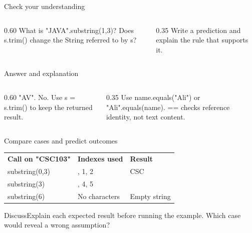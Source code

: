 \documentclass[10pt,aspectratio=169]{beamer}
\begin{document}
\begin{frame}[fragile,t]{Check your understanding}
\begin{columns}[T,onlytextwidth]\begin{column}{0.60\textwidth}
What is "JAVA".substring(1,3)? Does s.trim() change the String referred to by s?
\end{column}\begin{column}{0.35\textwidth}\small
Write a prediction and explain the rule that supports it.
\end{column}\end{columns}
\end{frame}

\begin{frame}[fragile,t]{Answer and explanation}
\begin{columns}[T,onlytextwidth]\begin{column}{0.60\textwidth}
"AV". No. Use s = s.trim() to keep the returned result.
\end{column}\begin{column}{0.35\textwidth}\small
Use name.equals("Ali") or "Ali".equals(name). == checks reference identity, not text content.
\end{column}\end{columns}
\end{frame}


\begin{frame}[fragile,t]{Compare cases and predict outcomes}
\small\renewcommand{\arraystretch}{1.5}
\begin{tabularx}{\textwidth}{>{\raggedright\arraybackslash}X>{\raggedright\arraybackslash}X>{\raggedright\arraybackslash}X}\rowcolor{navy}
\color{white}\bfseries Call on "CSC103" & \color{white}\bfseries Indexes used & \color{white}\bfseries Result\\
substring(0,3) & 0, 1, 2 & CSC\\
substring(3) & 3, 4, 5 & 103\\
substring(6) & No characters & Empty string\\
\end{tabularx}\par\vspace{3mm}\begin{exampleblock}{Discuss}Explain each expected result before running the example. Which case would reveal a wrong assumption?\end{exampleblock}
\end{frame}
\end{document}
